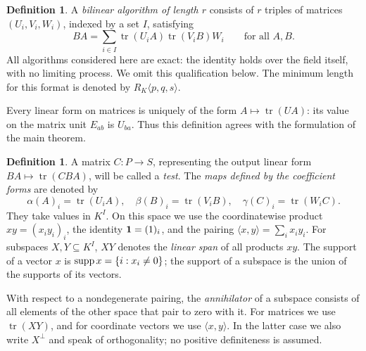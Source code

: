 \documentclass[11pt,a4paper]{article}
\numberwithin{equation}{section}
\theoremstyle{plain}
\theoremstyle{definition}
\newtheorem{definition}[theorem]{Definition}
\DeclareMathOperator{\tr}{tr}\DeclareMathOperator{\rk}{rk}
\newcommand{\pair}[2]{\langle #1,#2\rangle}
\begin{document}
\begin{definition}
A \emph{bilinear algorithm of length $r$} consists of $r$ triples of
matrices $(U_i,V_i,W_i)$, indexed by a set $I$, satisfying
\begin{equation}\label{eq:algorithm}
 BA=\sum_{i\in I}\tr(U_iA)\tr(V_iB)W_i\qquad\text{for all }A,B.
\end{equation}
All algorithms considered here are exact: the identity holds over the
field itself, with no limiting process. We omit this qualification below.
The minimum length for this format is denoted by
$R_K\langle p,q,s\rangle$.
\end{definition}
Every linear form on matrices is uniquely of the form
$A\mapsto\tr(UA)$: its value on the matrix unit $E_{ab}$ is $U_{ba}$.
Thus this definition agrees with the formulation of the main theorem.

\begin{definition}
A matrix $C:P\to S$, representing the output linear form
$BA\mapsto\tr(CBA)$, will be called a \emph{test}.
The \emph{maps defined by the coefficient forms} are denoted by
\[
 \alpha(A)_i=\tr(U_iA),\quad
 \beta(B)_i=\tr(V_iB),\quad
 \gamma(C)_i=\tr(W_iC).
\]
They take values in $K^I$. On this space we use the coordinatewise
product $xy=(x_i y_i)_i$, the identity $\mathbf1=(1)_i$, and the pairing
$\pair{x}{y}=\sum_i x_i y_i$. For subspaces $X,Y\subseteq K^I$,
$XY$ denotes the \emph{linear span} of all products $xy$.
The support of a vector $x$ is $\operatorname{supp} x=\{i:x_i\ne0\}$; the support
of a subspace is the union of the supports of its vectors.
\end{definition}
With respect to a nondegenerate pairing, the \emph{annihilator} of a
subspace consists of all elements of the other space that pair to zero
with it. For matrices we use $\tr(XY)$, and for coordinate vectors
we use $\pair{x}{y}$. In the latter case we also write $X^\perp$ and
speak of orthogonality; no positive definiteness is assumed.
\end{document}
